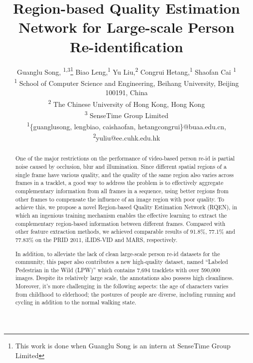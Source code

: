 \documentclass[letterpaper]{article} %
\begin{document}
%
\title{Region-based Quality Estimation Network for Large-scale Person Re-identification}
\author{Guanglu Song, \textsuperscript{1,3}\thanks{This work is done when Guanglu Song is an intern at SenseTime Group Limited} Biao Leng,\textsuperscript{1} Yu Liu,\textsuperscript{2} Congrui Hetang,\textsuperscript{1} Shaofan Cai \textsuperscript{1}\\
\textsuperscript{1} School of Computer Science and Engineering, Beihang University, Beijing 100191, China\\
\textsuperscript{2} The Chinese University of Hong Kong, Hong Kong\\
\textsuperscript{3} SenseTime Group Limited\\
\textsuperscript{1}\{guanglusong, lengbiao, caishaofan, hetangcongrui\}@buaa.edu.cn, \textsuperscript{2}yuliu@ee.cuhk.edu.hk
}

\maketitle
\begin{abstract}
One of the major restrictions on the performance of video-based person re-id is partial noise caused by occlusion, blur and illumination. Since different spatial regions of a single frame have various quality, and the quality of the same region also varies across frames in a tracklet, a good way to address the problem is to effectively aggregate complementary information from all frames in a sequence, using better regions from other frames to compensate the influence of an image region with poor quality. To achieve this, we propose a novel Region-based Quality Estimation Network (RQEN), in which an ingenious training mechanism enables the effective learning to extract the complementary region-based information between different frames. Compared with other feature extraction methods, we achieved comparable results of 91.8\%, 77.1\% and 77.83\% on the PRID 2011, iLIDS-VID and MARS, respectively.

In addition, to alleviate the lack of clean large-scale person re-id datasets for the community, this paper also contributes a new high-quality dataset, named ``Labeled Pedestrian in the Wild (LPW)'' which contains 7,694 tracklets with over 590,000 images. Despite its relatively large scale, the annotations also possess high cleanliness. Moreover, it's more challenging in the following aspects: the age of characters varies from childhood to elderhood; the postures of people are diverse, including running and cycling in addition to the normal walking state.
\end{abstract}
\end{document}
